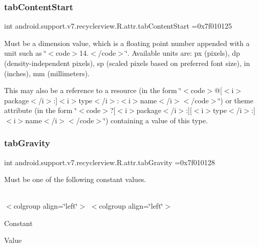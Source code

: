 \subsubsection{\texorpdfstring{tab\+Content\+Start}{tabContentStart}}
{\footnotesize\ttfamily int android.\+support.\+v7.\+recyclerview.\+R.\+attr.\+tab\+Content\+Start =0x7f010125\hspace{0.3cm}{\ttfamily [static]}}

Must be a dimension value, which is a floating point number appended with a unit such as \char`\"{}$<$code$>$14.\+5sp$<$/code$>$\char`\"{}. Available units are\+: px (pixels), dp (density-\/independent pixels), sp (scaled pixels based on preferred font size), in (inches), mm (millimeters). 

This may also be a reference to a resource (in the form \char`\"{}$<$code$>$@\mbox{[}$<$i$>$package$<$/i$>$\+:\mbox{]}$<$i$>$type$<$/i$>$\+:$<$i$>$name$<$/i$>$$<$/code$>$\char`\"{}) or theme attribute (in the form \char`\"{}$<$code$>$?\mbox{[}$<$i$>$package$<$/i$>$\+:\mbox{]}\mbox{[}$<$i$>$type$<$/i$>$\+:\mbox{]}$<$i$>$name$<$/i$>$$<$/code$>$\char`\"{}) containing a value of this type. \mbox{\label{classandroid_1_1support_1_1v7_1_1recyclerview_1_1R_1_1attr_ace0c65b266cccf5dbd223b86ae873815}} 
\subsubsection{\texorpdfstring{tab\+Gravity}{tabGravity}}
{\footnotesize\ttfamily int android.\+support.\+v7.\+recyclerview.\+R.\+attr.\+tab\+Gravity =0x7f010128\hspace{0.3cm}{\ttfamily [static]}}

Must be one of the following constant values.

\tabulinesep=1mm
\begin{longtabu} spread 0pt [c]{*{0}{|X[-1]}|}
\hline
\end{longtabu}
$<$colgroup align=\char`\"{}left\char`\"{}$>$ $<$colgroup align=\char`\"{}left\char`\"{}$>$ 

Constant

Value

